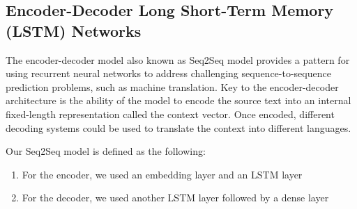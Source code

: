 \documentclass[runningheads]{llncs}
\begin{document}
	
	\subsection{Encoder-Decoder Long Short-Term Memory (LSTM) Networks}	
	The encoder-decoder model also known as Seq2Seq model provides a pattern for using recurrent neural networks to address challenging sequence-to-sequence prediction problems, such as machine translation.
	Key to the encoder-decoder architecture is the ability of the model to encode the source text into an internal fixed-length representation called the context vector. Once encoded, different decoding systems could be used to translate the context into different languages.

	\begin{minipage}{\linewidth}
		\begin{center}
			\hspace*{-.25in}
  			 \noindent{}
			\label{fig:Sequence to Sequence Model}
		\end{center}
	\end{minipage}
	\afterpage{\clearpage}
	
	Our Seq2Seq model is defined as the following:
	
	\begin{enumerate}
		\item For the encoder, we used an embedding layer and an LSTM layer
		\item For the decoder, we used another LSTM layer followed by a dense layer
	\end{enumerate}
	
\end{document}
